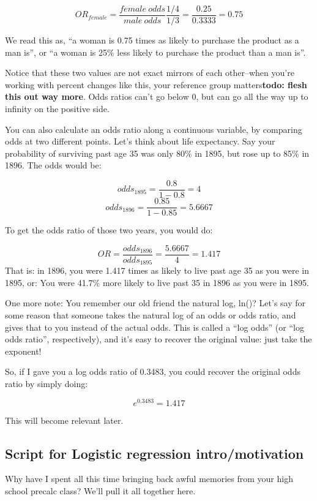 \documentclass[]{article}
\begin{document}
\[ OR_{female} = \frac{female \ odds}{male \ odds} \frac{1/4}{1/3} = \frac{0.25}{0.3333} = 0.75 \]

We read this as, ``a woman is 0.75 times as likely to purchase the
product as a man is'', or ``a woman is 25\% less likely to purchase the
product than a man is''.

Notice that these two values are not exact mirrors of each other--when
you're working with percent changes like this, your reference group
matters\textbf{todo: flesh this out way more}. Odds ratios can't go
below 0, but can go all the way up to infinity on the positive side.

You can also calculate an odds ratio along a continuous variable, by
comparing odds at two different points. Let's think about life
expectancy. Say your probability of surviving past age 35 was only 80\%
in 1895, but rose up to 85\% in 1896. The odds would be:

\[ odds_{1895} = \frac{0.8}{1-0.8} = 4 \]
\[ odds_{1896} = \frac{0.85}{1-0.85} = 5.6667 \]

To get the odds ratio of those two years, you would do:

\[ OR = \frac{odds_{1896}}{odds_{1895}} = \frac{5.6667}{4} = 1.417 \]
That is: in 1896, you were 1.417 times as likely to live past age 35 as
you were in 1895, or: You were 41.7\% more likely to live past 35 in
1896 as you were in 1895.

One more note: You remember our old friend the natural log, ln()? Let's
say for some reason that someone takes the natural log of an odds or
odds ratio, and gives that to you instead of the actual odds. This is
called a ``log odds'' (or ``log odds ratio'', respectively), and it's
easy to recover the original value: just take the exponent!

So, if I gave you a log odds ratio of 0.3483, you could recover the
original odds ratio by simply doing:

\[ e^{0.3483} = 1.417 \]

This will become relevant later.

\subsection{Script for Logistic regression
intro/motivation}\label{script-for-logistic-regression-intromotivation}

Why have I spent all this time bringing back awful memories from your
high school precalc class? We'll pull it all together here.
\end{document}
